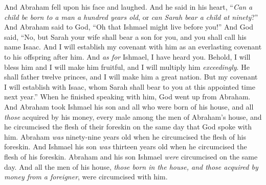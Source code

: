 \begin{biblechapter}
\verse And Abraham fell upon his face and laughed. And he said in his heart, “\textit{Can a child be born to a man a hundred years old}, or \textit{can Sarah bear a child at ninety}?”
\verse And Abraham said to God, “Oh that Ishmael might live before you!”
\verse And God said, “No, but Sarah your wife shall bear a son for you, and you shall call his name Isaac. And I will establish my covenant with him as an everlasting covenant to his offspring after him.
\verse And \textit{as for} Ishmael, I have heard you. Behold, I will bless him and I will make him fruitful, and I will multiply him \textit{exceedingly}. He shall father twelve princes, and I will make him a great nation.
\verse But my covenant I will establish with Isaac, whom Sarah shall bear to you at this appointed time next year.”
\verse When he finished speaking with him, God went up from Abraham.
\verse And Abraham took Ishmael his son and all who were born of his house, and all \textit{those} acquired by his money, every male among the men of Abraham’s house, and he circumcised the flesh of their foreskin on the same day that God spoke with him.
\verse Abraham \textit{was} ninety-nine years old when he circumcised the flesh of his foreskin.
\verse And Ishmael his son \textit{was} thirteen years old when he circumcised the flesh of his foreskin.
\verse Abraham and his son Ishmael \textit{were} circumcised on the same day.
\verse And all the men of his house, \textit{those born in the house, and those acquired by money from a foreigner}, were circumcised with him.
\end{biblechapter}

